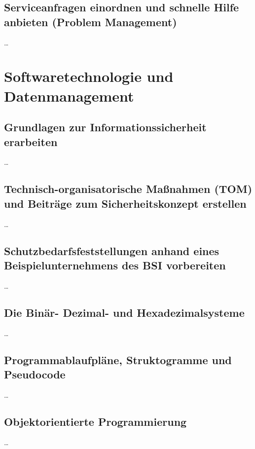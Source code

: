 \documentclass[a4paper, 12pt]{report}
\begin{document}
\section{Serviceanfragen einordnen und schnelle Hilfe anbieten (Problem Management)}
\dots


\chapter{Softwaretechnologie und Datenmanagement}

\section{Grundlagen zur Informationssicherheit erarbeiten}
\dots

\section{Technisch-organisatorische Maßnahmen (TOM) und Beiträge zum Sicherheitskonzept erstellen}
\dots

\section{Schutzbedarfsfeststellungen anhand eines Beispielunternehmens des BSI vorbereiten}
\dots

\section{Die Binär- Dezimal- und Hexadezimalsysteme}
\dots

\section{Programmablaufpläne, Struktogramme und Pseudocode}
\dots

\section{Objektorientierte Programmierung}
\dots
\end{document}
